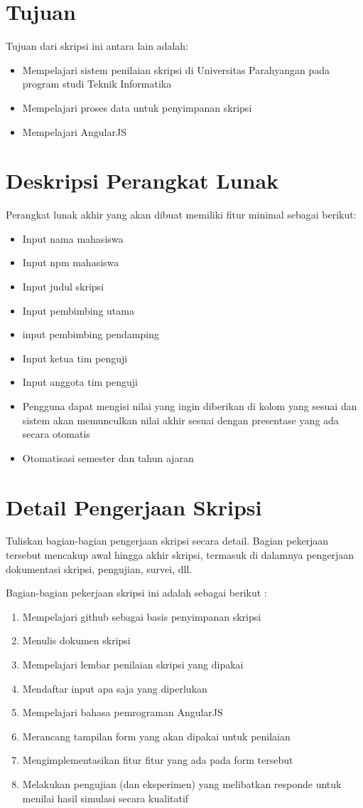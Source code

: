 \documentclass[a4paper,twoside]{article}
\begin{document}
\section{Tujuan}
Tujuan dari skripsi ini antara lain adalah:
\begin{itemize}
	\item Mempelajari sistem penilaian skripsi di Universitas Parahyangan pada program studi Teknik Informatika
	\item Mempelajari proses data untuk penyimpanan skripsi
	\item Mempelajari AngularJS
\end{itemize}

\section{Deskripsi Perangkat Lunak}
Perangkat lunak akhir yang akan dibuat memiliki fitur minimal sebagai berikut:
\begin{itemize}
	\item Input nama mahasiswa
	\item Input npm mahasiswa
	\item Input judul skripsi
	\item Input pembimbing utama
	\item input pembimbing pendamping
	\item Input ketua tim penguji
	\item Input anggota tim penguji
	\item Pengguna dapat mengisi nilai yang ingin diberikan di kolom yang sesuai dan sistem akan memunculkan nilai akhir sesuai dengan presentase yang ada secara otomatis
	\item Otomatisasi semester dan tahun ajaran
\end{itemize}

\section{Detail Pengerjaan Skripsi}
Tuliskan bagian-bagian pengerjaan skripsi secara detail. Bagian pekerjaan tersebut mencakup awal hingga akhir skripsi, termasuk di dalamnya pengerjaan dokumentasi skripsi, pengujian, survei, dll.

Bagian-bagian pekerjaan skripsi ini adalah sebagai berikut :
	\begin{enumerate}
		\item Mempelajari github sebagai basis penyimpanan skripsi
		\item Menulis dokumen skripsi
		\item Mempelajari lembar penilaian skripsi yang dipakai
		\item Mendaftar input apa saja yang diperlukan
		\item Mempelajari bahasa pemrograman AngularJS
		\item Merancang tampilan form yang akan dipakai untuk penilaian
		\item Mengimplementasikan fitur fitur yang ada pada form tersebut
		\item Melakukan pengujian (dan eksperimen) yang melibatkan responde untuk menilai hasil simulasi secara kualitatif
	\end{enumerate}
\end{document}
